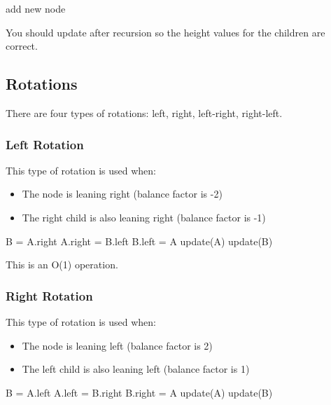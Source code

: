 \begin{algorithm}[H]
	 {
		add new node\;
	}
	\caption{Add}
\end{algorithm}

\begin{note}
You should update after recursion so the height values for the children are correct.
\end{note}

\subsection{Rotations}
There are four types of rotations: left, right, left-right, right-left.
\subsubsection{Left Rotation}
This type of rotation is used when:
\begin{itemize}
	\item The node is leaning right (balance factor is -2)
	\item The right child is also leaning right (balance factor is -1)
\end{itemize}

\begin{algorithm}[H]
	\caption{Left Rotation}
	B = A.right\;
	A.right = B.left\;
	B.left = A\;
	update(A)\;
	update(B)\;
\end{algorithm}

\begin{note}
This is an O(1) operation.
\end{note}

\subsubsection{Right Rotation}
This type of rotation is used when:
\begin{itemize}
	\item The node is leaning left (balance factor is 2)
		\item The left child is also leaning left (balance factor is 1)
\end{itemize}

\begin{algorithm}[H]
	\caption{Right Rotation}
	B = A.left\;
	A.left = B.right\;
	B.right = A\;
	update(A)\;
	update(B)\;
\end{algorithm}

